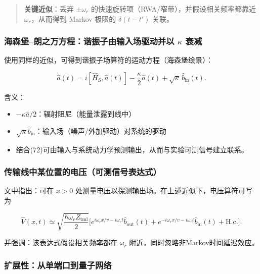 \documentclass[12pt,a4paper,oneside]{ctexbook}
\begin{document}
\begin{quote}
\textbf{关键近似}：丢弃 $\pm\omega_r$ 的快速旋转项（RWA/窄带），并假设相关频率都靠近 $\omega_r$，从而得到 Markov 极限的 $\delta(t-t')$ 关联。
\end{quote}

\subsubsection{海森堡--朗之万方程：谐振子由输入场驱动并以 $\kappa$ 衰减}

使用同样的近似，可得到谐振子场算符的运动方程（海森堡绘景）：

\begin{equation}
\dot{\hat a}(t)=i[\hat H_S,\hat a(t)]-\frac{\kappa}{2}\hat a(t)+\sqrt{\kappa}\,\hat b_{\mathrm{in}}(t).
\tag{75}
\end{equation}

含义：
\begin{itemize}
  \item $-\kappa\hat a/2$：辐射阻尼（能量泄露到线中）
  \item $\sqrt{\kappa}\hat b_{\mathrm{in}}$：输入场（噪声/外加驱动）对系统的驱动
  \item 结合(72)可由输入与系统动力学预测输出，从而与实验可测信号建立联系。
\end{itemize}

\subsubsection{传输线中某位置的电压（可测信号表达式）}

文中指出：可在 $x>0$ 处测量电压以探测输出场。在上述近似下，电压算符可写为

\begin{equation}
\hat V(x,t)\simeq
\sqrt{\frac{\hbar\omega_r Z_{\mathrm{tml}}}{2}}
\Big[
e^{i\omega_r x/v-i\omega_r t}\hat b_{\mathrm{out}}(t)
+
e^{-i\omega_r x/v-i\omega_r t}\hat b_{\mathrm{in}}(t)
+\mathrm{H.c.}
\Big].
\tag{76}
\end{equation}

并强调：该表达式假设相关频率都在 $\omega_r$ 附近，同时忽略非Markov时间延迟效应。

\subsubsection{扩展性：从单端口到量子网络}
\end{document}
